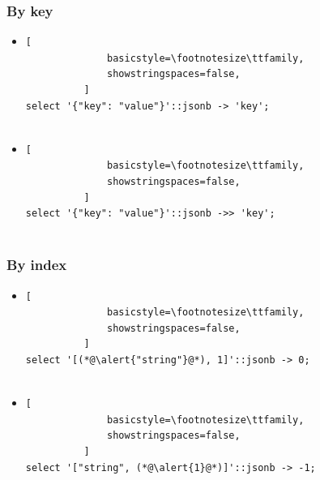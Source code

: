 \documentclass[14pt, compress]{beamer}
\begin{document}
\begin{frame}[fragile]
  \frametitle{By key}

  \begin{itemize}
      \item
          \begin{lstlisting}[
              basicstyle=\footnotesize\ttfamily,
              showstringspaces=false,
          ]
select '{"key": "value"}'::jsonb -> 'key';
         
          \end{lstlisting}

      \item
          \begin{lstlisting}[
              basicstyle=\footnotesize\ttfamily,
              showstringspaces=false,
          ]
select '{"key": "value"}'::jsonb ->> 'key';
         
          \end{lstlisting}

  \end{itemize}

\end{frame}

\begin{frame}[fragile]
  \frametitle{By index}

  \begin{itemize}
      \item
          \begin{lstlisting}[
              basicstyle=\footnotesize\ttfamily,
              showstringspaces=false,
          ]
select '[(*@\alert{"string"}@*), 1]'::jsonb -> 0;
         
          \end{lstlisting}

      \item
          \begin{lstlisting}[
              basicstyle=\footnotesize\ttfamily,
              showstringspaces=false,
          ]
select '["string", (*@\alert{1}@*)]'::jsonb -> -1;
         
          \end{lstlisting}

  \end{itemize}

\end{frame}
\end{document}
